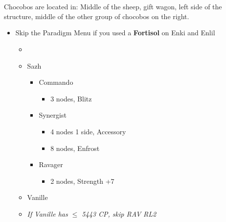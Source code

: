 \chapter[Chapter 8]{}

\begin{multicols}{2}
  Chocobos are located in: Middle of the sheep, gift wagon, left side of the structure, middle of the other group of chocobos on the right.
  \begin{menu}
    \begin{itemize}
      \item Skip the Paradigm Menu if you used a \textbf{Fortisol} on Enki and Enlil
      \paradigm
      \begin{itemize}
        \item {}%
              {\paradigmline[1]{\textit{\com}}{\textit{\rav}}{}}%
              {\paradigmline{(\com)}{(\med)}{}}%
              {\paradigmline{\syn}{\sab}{}}%
              {\paradigmline{\rav}{\rav}{}}%
              {\paradigmline{\rav}{\sab}{}}%
              {\paradigmline{\com}{\sab}{}}
      \end{itemize}
      \crystarium
      \begin{itemize}
        \item Sazh
              \begin{itemize}
                \item Commando
                      \begin{itemize}
                        \item 3 nodes, Blitz
                      \end{itemize}
                \item Synergist
                      \begin{itemize}
                        \item 4 nodes 1 side, Accessory
                        \item 8 nodes, Enfrost
                      \end{itemize}
                \item Ravager
                      \begin{itemize}
                        \item 2 nodes, Strength +7
                      \end{itemize}
              \end{itemize}
        \item Vanille
        \item \textit{If Vanille has $\le$ 5443 CP, skip RAV RL2}

\end{itemize}
\end{itemize}
\end{menu}
\end{multicols}
